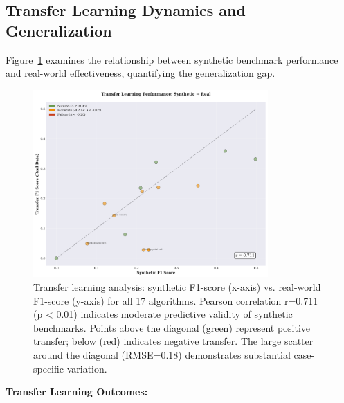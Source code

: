 \subsection{Transfer Learning Dynamics and Generalization}

Figure~\ref{fig:transfer_learning_scatter} examines the relationship between synthetic benchmark performance and real-world effectiveness, quantifying the generalization gap.

\begin{figure}[H]
\centering
\includegraphics[width=0.80\textwidth]{figures/fig_transfer_learning_scatter.png}
\caption{Transfer learning analysis: synthetic F1-score (x-axis) vs. real-world F1-score (y-axis) for all 17 algorithms. Pearson correlation r=0.711 (p < 0.01) indicates moderate predictive validity of synthetic benchmarks. Points above the diagonal (green) represent positive transfer; below (red) indicates negative transfer. The large scatter around the diagonal (RMSE=0.18) demonstrates substantial case-specific variation.}
\label{fig:transfer_learning_scatter}
\end{figure}

\textbf{Transfer Learning Outcomes:}


